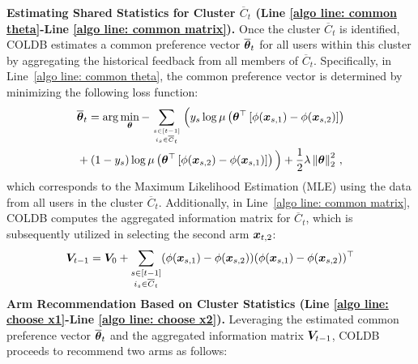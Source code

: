 \noindent\textbf{Estimating Shared Statistics for Cluster $\overline{C}_t$ (Line \ref{algo line: common theta}-Line \ref{algo line: common matrix}).} Once the cluster $\overline{C}_t$ is identified, COLDB estimates a common preference vector $\overline{\boldsymbol{\theta}}_t$ for all users within this cluster by aggregating the historical feedback from all members of $\overline{C}_t$. 
Specifically, in Line~\ref{algo line: common theta}, the common preference vector is determined by minimizing the following loss function:
\begin{align}
    &\overline{\boldsymbol{\theta}}_t=\arg\min_{\boldsymbol{\theta}} - \sum_{s\in[t-1]\atop i_s\in \overline C_t} \Big( y_s\log\mu\left({\boldsymbol{\theta}}^{\top}\left[\phi(\boldsymbol{x}_{s,1}) - \phi(\boldsymbol{x}_{s,2})\right]\right) \notag\\
    &+ (1-y_s)\log\mu\left({\boldsymbol{\theta}}^{\top}\left[\phi(\boldsymbol{x}_{s,2}) - \phi(\boldsymbol{x}_{s,1})\right]\right) \Big) + \frac{1}{2}\lambda\left\| \boldsymbol{\theta} \right\|_2^2  \,,\label{eq: solve common theta}
\end{align}
which corresponds to the Maximum Likelihood Estimation (MLE) using the data from all users in the cluster $\overline{C}_t$.
Additionally, in Line~\ref{algo line: common matrix}, COLDB computes the aggregated information matrix for $\overline{C}_t$, which is subsequently utilized in selecting the second arm $\boldsymbol{x}_{t,2}$:
\begin{equation}
    \boldsymbol{V}_{t-1} = \boldsymbol{V}_0 + \sum_{\substack{s \in [t-1] \\ i_s \in \overline{C}_t}} (\phi(\boldsymbol{x}_{s,1}) - \phi(\boldsymbol{x}_{s,2})) (\phi(\boldsymbol{x}_{s,1}) - \phi(\boldsymbol{x}_{s,2}))^\top
    \label{eq:update:info:matrix:v:linear}
\end{equation}
\noindent\textbf{Arm Recommendation Based on Cluster Statistics (Line \ref{algo line: choose x1}-Line \ref{algo line: choose x2}).} Leveraging the estimated common preference vector $\overline{\boldsymbol{\theta}}_t$ and the aggregated information matrix $\boldsymbol{V}_{t-1}$, COLDB proceeds to recommend two arms as follows:

